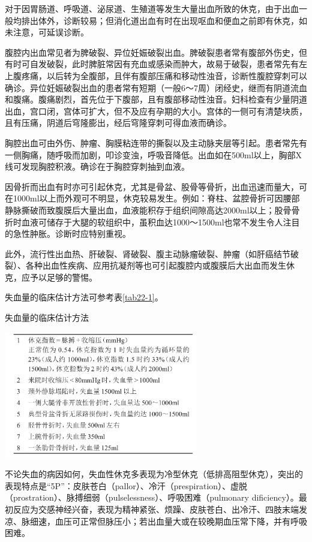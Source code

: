 对于因胃肠道、呼吸道、泌尿道、生殖道等发生大量出血所致的休克，由于出血一般均排出体外，诊断较易；但消化道出血有时在出现呕血和便血之前即有休克，如未注意，可延误诊断。

腹腔内出血常见者为脾破裂、异位妊娠破裂出血。脾破裂患者常有腹部外伤史，但有时可自发破裂，此时脾脏常因有充血或感染而肿大，故易于破裂，患者常先有左上腹疼痛，以后转为全腹部，且伴有腹部压痛和移动性浊音，诊断性腹腔穿刺可以确诊。异位妊娠破裂出血的患者常有短期（一般6～7周）闭经史，继而有阴道流血和腹痛。腹痛剧烈，首先位于下腹部，且有腹部移动性浊音。妇科检查有少量阴道出血，宫口闭，宫体可扩大，但不及应有孕期的大小。宫体的一侧可有清楚块质，且有压痛，阴道后穹隆膨出，经后穹隆穿刺可得血液而确诊。

胸腔出血可由外伤、肿瘤、胸膜粘连带的撕裂以及主动脉夹层等引起。患者常先有一侧胸痛，随呼吸而加剧，叩诊变浊，呼吸音降低。出血如在500ml以上，胸部X线可发现胸腔积液。确诊在于胸腔穿刺抽到血液。

因骨折而出血有时亦可引起休克，尤其是骨盆、股骨等骨折，出血迅速而量大，可在1000ml以上而外观可不明显，休克较易发生。例如：脊柱、盆腔骨折可因腰部静脉撕破而致腹膜后大量出血，血液能积存于组织间隙高达2000ml以上；股骨骨折时血液可储存于大腿的软组织中，虽积血达1000～1500ml也常不发生令人注目的急性肿胀。诊断时应特别重视。

此外，流行性出血热、肝破裂、肾破裂、腹主动脉瘤破裂、肿瘤（如肝癌结节破裂）、各种出血性疾病、应用抗凝剂等也可引起腹腔内或腹膜后大出血而发生休克，应予以足够的警惕。

失血量的临床估计方法可参考表\ref{tab22-1}。

\begin{table}[htbp]
\centering
\caption{失血量的临床估计方法}
\label{tab22-1}
\includegraphics[width=3.33333in,height=2.17708in]{./images/Image00090.jpg}
\end{table}

不论失血的病因如何，失血性休克多表现为冷型休克（低排高阻型休克），突出的表现特点是“5P”：皮肤苍白（pallor）、冷汗（prespiration）、虚脱（prostration）、脉搏细弱（pulselessness）、呼吸困难（pulmonary
dificiency）。最初反应为交感神经兴奋，表现为精神紧张、烦躁、皮肤苍白、出冷汗、四肢末端发凉、脉细速，血压可正常但脉压小；若出血量大或在较晚期血压常下降，并有呼吸困难。

